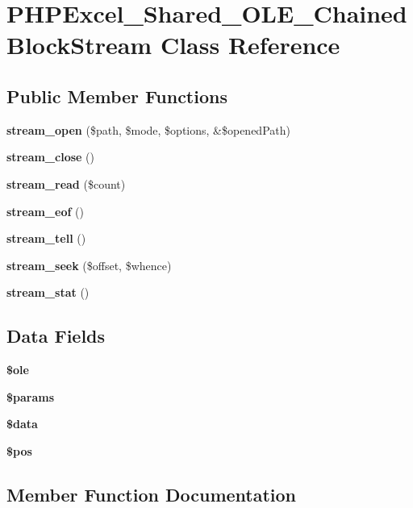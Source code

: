 \section{P\+H\+P\+Excel\+\_\+\+Shared\+\_\+\+O\+L\+E\+\_\+\+Chained\+Block\+Stream Class Reference}
\label{class_p_h_p_excel___shared___o_l_e___chained_block_stream}
\subsection*{Public Member Functions}
\begin{DoxyCompactItemize}
\item 
{\bf stream\+\_\+open} (\$path, \$mode, \$options, \&\$opened\+Path)
\item 
{\bf stream\+\_\+close} ()
\item 
{\bf stream\+\_\+read} (\$count)
\item 
{\bf stream\+\_\+eof} ()
\item 
{\bf stream\+\_\+tell} ()
\item 
{\bf stream\+\_\+seek} (\$offset, \$whence)
\item 
{\bf stream\+\_\+stat} ()
\end{DoxyCompactItemize}
\subsection*{Data Fields}
\begin{DoxyCompactItemize}
\item 
{\bfseries \$ole}\label{class_p_h_p_excel___shared___o_l_e___chained_block_stream_a87048ace5ace790855de1f5ddde31e0a}

\item 
{\bfseries \$params}\label{class_p_h_p_excel___shared___o_l_e___chained_block_stream_afe68e6fbe7acfbffc0af0c84a1996466}

\item 
{\bfseries \$data}\label{class_p_h_p_excel___shared___o_l_e___chained_block_stream_a6efc15b5a2314dd4b5aaa556a375c6d6}

\item 
{\bfseries \$pos}\label{class_p_h_p_excel___shared___o_l_e___chained_block_stream_a5de51f0c80b3bb3b39a57b23f6b9ea9f}

\end{DoxyCompactItemize}


\subsection{Member Function Documentation}
